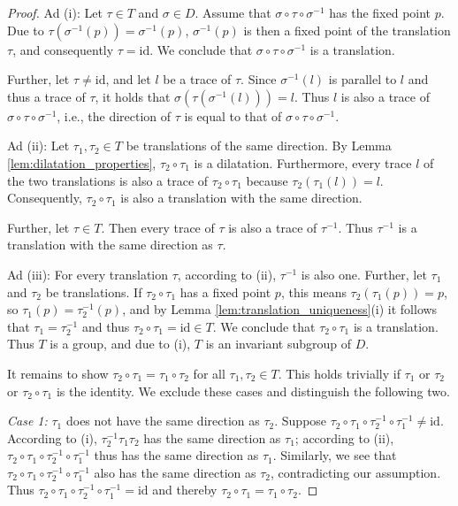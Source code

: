 \documentclass[11pt,a4paper]{article}
\begin{document}
\begin{proof}
Ad (i): Let $\tau \in T$ and $\sigma \in D$. Assume that $\sigma \circ \tau \circ \sigma^{-1}$ has the fixed point $p$. Due to $\tau(\sigma^{-1}(p)) = \sigma^{-1}(p)$, $\sigma^{-1}(p)$ is then a fixed point of the translation $\tau$, and consequently $\tau = \text{id}$. We conclude that $\sigma \circ \tau \circ \sigma^{-1}$ is a translation.

Further, let $\tau \neq \text{id}$, and let $l$ be a trace of $\tau$. Since $\sigma^{-1}(l)$ is parallel to $l$ and thus a trace of $\tau$, it holds that $\sigma(\tau(\sigma^{-1}(l))) = l$. Thus $l$ is also a trace of $\sigma \circ \tau \circ \sigma^{-1}$, i.e., the direction of $\tau$ is equal to that of $\sigma \circ \tau \circ \sigma^{-1}$.

Ad (ii): Let $\tau_1, \tau_2 \in T$ be translations of the same direction. By Lemma \ref{lem:dilatation_properties}, $\tau_2 \circ \tau_1$ is a dilatation. Furthermore, every trace $l$ of the two translations is also a trace of $\tau_2 \circ \tau_1$ because $\tau_2(\tau_1(l)) = l$. Consequently, $\tau_2 \circ \tau_1$ is also a translation with the same direction.

Further, let $\tau \in T$. Then every trace of $\tau$ is also a trace of $\tau^{-1}$. Thus $\tau^{-1}$ is a translation with the same direction as $\tau$.

Ad (iii): For every translation $\tau$, according to (ii), $\tau^{-1}$ is also one. Further, let $\tau_1$ and $\tau_2$ be translations. If $\tau_2 \circ \tau_1$ has a fixed point $p$, this means $\tau_2(\tau_1(p)) = p$, so $\tau_1(p) = \tau_2^{-1}(p)$, and by Lemma \ref{lem:translation_uniqueness}(i) it follows that $\tau_1 = \tau_2^{-1}$ and thus $\tau_2 \circ \tau_1 = \text{id} \in T$. We conclude that $\tau_2 \circ \tau_1$ is a translation. Thus $T$ is a group, and due to (i), $T$ is an invariant subgroup of $D$.

It remains to show $\tau_2 \circ \tau_1 = \tau_1 \circ \tau_2$ for all $\tau_1, \tau_2 \in T$. This holds trivially if $\tau_1$ or $\tau_2$ or $\tau_2 \circ \tau_1$ is the identity. We exclude these cases and distinguish the following two.

\textit{Case 1:} $\tau_1$ does not have the same direction as $\tau_2$. Suppose $\tau_2 \circ \tau_1 \circ \tau_2^{-1} \circ \tau_1^{-1} \neq \text{id}$. According to (i), $\tau_2^{-1} \tau_1 \tau_2$ has the same direction as $\tau_1$; according to (ii), $\tau_2 \circ \tau_1 \circ \tau_2^{-1} \circ \tau_1^{-1}$ thus has the same direction as $\tau_1$. Similarly, we see that $\tau_2 \circ \tau_1 \circ \tau_2^{-1} \circ \tau_1^{-1}$ also has the same direction as $\tau_2$, contradicting our assumption. Thus $\tau_2 \circ \tau_1 \circ \tau_2^{-1} \circ \tau_1^{-1} = \text{id}$ and thereby $\tau_2 \circ \tau_1 = \tau_1 \circ \tau_2$.


\end{proof}
\end{document}
